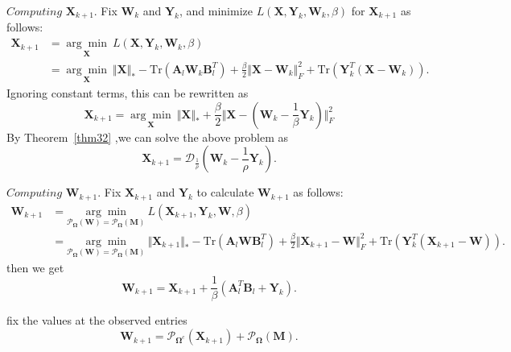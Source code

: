 \documentclass{article}
\begin{document}
{$\textit{Computing}$  $\mathbf X_{k+1}$. Fix $\mathbf W_k$ and $\mathbf Y_k$, and minimize $L(\mathbf X,\mathbf Y_k,\mathbf W_k,\beta)$ for $\mathbf X_{k+1}$ as follows:
\begin{equation}
\begin{aligned}
    \mathbf X_{k+1} & =\underset{\mathbf X}{\arg\min}\ L(\mathbf X,\mathbf Y_k, \mathbf W_k,\beta) \\
    & =  \underset{\mathbf X}{\arg\min} \ \Vert\mathbf X \Vert_* - \text{Tr}(\mathbf A_l\mathbf W_k\mathbf B_l^T)    + \frac{\beta}{2}\Vert\mathbf X-\mathbf W_k \Vert_F^2 + \text{Tr}(\mathbf Y_k^T(\mathbf X-\mathbf W_k)).
\end{aligned}
\end{equation}
Ignoring constant terms, this can be rewritten as 
\begin{equation}
    \mathbf X_{k+1} = \underset{\mathbf X}{\arg\min} \ \Vert\mathbf X \Vert_* + \frac{\beta}{2} \Vert\mathbf X-\left(\mathbf W_k - \frac{1}{\beta}\mathbf Y_k \right) \Vert_F^2
\end{equation}
By Theorem~\ref{thm32} ,we can solve the above problem as
\begin{equation}
    \mathbf X_{k+1} = \mathcal{D}_{\frac{1}{\rho}}(\mathbf W_k - \frac{1}{\rho}\mathbf Y_k).
\label{admmx}
\end{equation}


$\textit{Computing}$  $\mathbf W_{k+1}$. Fix $\mathbf X_{k+1}$ and $\mathbf Y_k$ to calculate $\mathbf W_{k+1}$ as follows:
\begin{equation}
\begin{aligned}
    \mathbf W_{k+1}& = \underset{\mathcal{P}_{\mathbf\Omega}(\mathbf W) = \mathcal{P}_{\mathbf\Omega}(\mathbf M)}{\arg\min} \ L(\mathbf X_{k+1},\mathbf Y_k,\mathbf W,\beta) \\
    & =  \underset{\mathcal{P}_{\mathbf\Omega}(\mathbf W) = \mathcal{P}_{\mathbf\Omega}(\mathbf M)}{\arg\min} \ \Vert\mathbf X_{k+1}\Vert_* - \text{Tr}(\mathbf A_l \mathbf W \mathbf B_l^T)    + \frac{\beta}{2}\Vert\mathbf X_{k+1}-\mathbf W \Vert_F^2 + \text{Tr}(\mathbf Y_k^T(\mathbf X_{k+1}-\mathbf W)).
\end{aligned}
\end{equation}
then we get
\begin{equation}
    \mathbf W_{k+1} = \mathbf X_{k+1} + \frac{1}{\beta}(\mathbf A_l^T\mathbf B_l + \mathbf Y_k).
\end{equation}

fix the values at the observed entries
\begin{equation}
    \mathbf W_{k+1} = \mathcal{P}_{\mathbf  \Omega^c}(\mathbf X_{k+1}) + \mathcal{P}_{\mathbf \Omega}(\mathbf M).
\end{equation}

}
\end{document}
